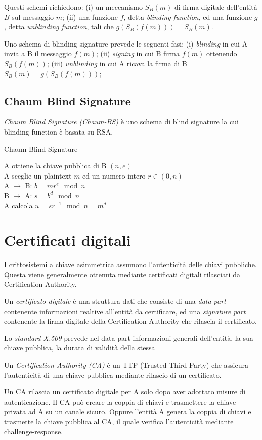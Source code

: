 Questi schemi richiedono:
(i) un meccanismo $S_{B}(m)$ di firma digitale dell'entità $B$ sul messaggio $m$;
(ii) una funzione $f$, detta \textit{blinding function}, ed una funzione $g$, detta \textit{unblinding function}, tali che $g(S_{B}(f(m)))=S_{B}(m)$.

Uno schema di blinding signature prevede le seguenti fasi:
(i) \textit{blinding} in cui A invia a B il messaggio $f(m)$;
(ii) \textit{signing} in cui B firma $f(m)$ ottenendo $S_{B}(f(m))$;
(iii) \textit{unblinding} in cui A ricava la firma di B $S_{B}(m)=g(S_{B}(f(m)))$;


\subsection{Chaum Blind Signature}
\textit{Chaum Blind Signature (Chaum-BS)} è uno schema di blind signature la cui blinding function è basata su RSA.

\bigskip
\begin{algorithm}[H]
  \caption{Chaum Blind Signature}
  \label{alg:authentication-blind-signature-chaum}
  \SetAlgoNoLine
  A ottiene la chiave pubblica di B $(n,e)$\\
  A sceglie un plaintext $m$ ed un numero intero $r \in (0,n)$\\
  A $\rightarrow$ B: $b=mr^{e} \mod n$\\
  B $\rightarrow$ A: $s=b^{d} \mod n$\\
  A calcola $u=sr^{-1} \mod n=m^{d}$
\end{algorithm}


\section{Certificati digitali}
I crittosistemi a chiave asimmetrica assumono l'autenticità delle chiavi pubbliche. Questa viene generalmente ottenuta mediante certificati digitali rilasciati da Certification Authority.

Un \textit{certificato digitale} è una struttura dati che consiste di una \textit{data part} contenente informazioni realtive all'entità da certificare, ed una \textit{signature part} contenente la firma digitale della Certification Authority che rilascia il certificato.

Lo \textit{standard X.509} prevede nel data part informazioni generali dell'entità, la sua chiave pubblica, la durata di validità della stessa

Un \textit{Certification Authority (CA)} è un TTP (Trusted Third Party) che assicura l'autenticità di una chiave pubblica mediante rilascio di un certificato.

Un CA rilascia un certificato digitale per A solo dopo aver adottato misure di autenticazione. Il CA può creare la coppia di chiavi e trasmettere la chiave privata ad A su un canale sicuro. Oppure l'entità A genera la coppia di chiavi e trasmette la chiave pubblica al CA, il quale verifica l'autenticità mediante challenge-response.
